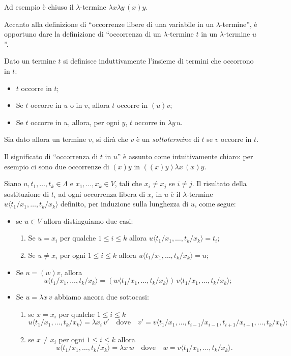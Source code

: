 Ad esempio è chiuso il $\lambda$-termine $\lambda x\lambda y\,(x)y$.

Accanto alla definizione di ``occorrenze libere di una variabile in un $\lambda$-termine'', è opportuno dare la definizione di ``occorrenza di un $\lambda$-termine $t$ in un $\lambda$-termine $u$''.

\begin{defi}[Sottotermine]
Dato un termine $t$ si definisce induttivamente l'insieme di termini che occorrono in $t$:
\begin{itemize}
    \item $t$ occorre in $t$;
    \item Se $t$ occorre in $u$ o in $v$, allora $t$ occorre in $(u)v$;
    \item Se $t$ occorre in $u$, allora, per ogni $y$, $t$ occorre in $\lambda y\,u$.
\end{itemize}
Sia dato allora un termine $v$, si dirà che $v$ è un \emph{sottotermine} di $t$ se $v$ occorre in $t$.
\end{defi}

Il significato di ``occorrenza di $t$ in $u$'' è assunto come intuitivamente chiaro: per esempio ci sono due occorrenze di $(x)y$ in $((x)y)\lambda x\,(x)y$.

\begin{defi}
Siano $u,t_1,\dots,t_k\in\Lambda$ e $x_1,\dots,x_k\in V$, tali che $x_i\neq x_j$ se $i\neq j$. Il risultato della sostituzione di $t_i$ ad ogni occorrenza libera di $x_i$ in $u$ è il $\lambda$-termine $u\langle t_1/x_1,\dots,t_k/x_k\rangle$ definito, per induzione sulla lunghezza di $u$, come segue:
\begin{itemize}
    \item se $u\in V$ allora distinguiamo due casi:
    \begin{enumerate}
        \item[i)] Se $u=x_i$ per qualche $1\le i\le k$ allora $u\langle t_1/x_1,\dots,t_k/x_k\rangle=t_i$;
        \item[ii)] Se $u\neq x_i$ per ogni $1\le i\le k$ allora $u\langle t_1/x_1,\dots,t_k/x_k\rangle=u$;
    \end{enumerate}
    \item Se $u=(w)v$, allora
    \[
    u\langle t_1/x_1,\dots,t_k/x_k\rangle=(w\langle t_1/x_1,\dots,t_k/x_k\rangle)\,v\langle t_1/x_1,\dots,t_k/x_k\rangle;
    \]
    \item Se $u=\lambda x\,v$ abbiamo ancora due sottocasi:
    \begin{enumerate}
        \item[i)] se $x=x_i$ per qualche $1\le i\le k$
        \[
        u\langle t_1/x_1,\dots,t_k/x_k\rangle=\lambda x_i\,v'
        \quad\text{dove}\quad
        v'=v\langle t_1/x_1,\dots,t_{i-1}/x_{i-1},t_{i+1}/x_{i+1},\dots,t_k/x_k\rangle;
        \]
        \item[ii)] se $x\neq x_i$ per ogni $1\le i\le k$ allora
        \[
        u\langle t_1/x_1,\dots,t_k/x_k\rangle=\lambda x\,w
        \quad\text{dove}\quad
        w=v\langle t_1/x_1,\dots,t_k/x_k\rangle.
        \]
    \end{enumerate}
\end{itemize}
\end{defi}

